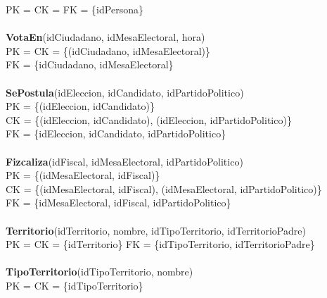   PK = CK = FK = \{idPersona\}\\
\\
\textbf{VotaEn}(idCiudadano, idMesaElectoral, hora)\\
  PK = CK = \{(idCiudadano, idMesaElectoral)\}\\
  FK = \{idCiudadano, idMesaElectoral\}\\
\\
\textbf{SePostula}(idEleccion, idCandidato, idPartidoPolitico)\\
  PK = \{(idEleccion, idCandidato)\}\\
  CK = \{(idEleccion, idCandidato), (idEleccion, idPartidoPolitico)\}\\
  FK = \{idEleccion, idCandidato, idPartidoPolitico\}\\
\\
\textbf{Fizcaliza}(idFiscal, idMesaElectoral, idPartidoPolitico)\\
  PK = \{(idMesaElectoral, idFiscal)\}\\
  CK = \{(idMesaElectoral, idFiscal), (idMesaElectoral, idPartidoPolitico)\}\\
  FK = \{idMesaElectoral, idFiscal, idPartidoPolitico\}\\
\\
\textbf{Territorio}(idTerritorio, nombre, idTipoTerritorio, idTerritorioPadre)\\
  PK = CK = \{idTerritorio\}
  FK = \{idTipoTerritorio, idTerritorioPadre\}\\
\\
\textbf{TipoTerritorio}(idTipoTerritorio, nombre)\\
  PK = CK = \{idTipoTerritorio\}\\	